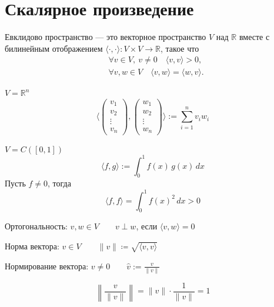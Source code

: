 \section{Скалярное произведение}

\begin{definition}
    Евклидово пространство --- это векторное пространство $V$ над $\mathbb{R}$
    вместе с билинейным отображением $\langle\cdot,\cdot\rangle \colon V \times V  \to \mathbb{R}$,
    такое что 
    \[
    \begin{aligned}
        &\forall v \in V, \ v \ne 0 \quad \langle v,v\rangle > 0, \\
        &\forall v, w \in V \quad \langle v, w\rangle = \langle w, v\rangle.
    \end{aligned}
    \]
\end{definition}

\begin{examplelist}
        \item $V = \mathbb{R}^n$
            \[
            \langle
            \begin{pmatrix} v_1 \\ v_2 \\ \vdots \\ v_n \end{pmatrix},
            \begin{pmatrix} w_1 \\ w_2 \\ \vdots \\ w_n \end{pmatrix}
            \rangle
            := \sum_{i=1}^{n} v_i w_i
            \]
        \item $V = C([0,1])$
            \[
            \langle f, g\rangle := \int_0^1 f(x)\, g(x)\, dx
            \]
            Пусть $f \neq 0$, тогда
            \[
            \langle f, f\rangle = \int_0^1 f(x)^2\, dx > 0
            \]
\end{examplelist}


\begin{definition}
    Ортогональность:
    $v, w \in V \qquad v \perp w$, если $\langle v,w\rangle = 0$
\end{definition}

\begin{definition}
    Норма вектора:
    $v \in V \qquad \lVert v \rVert \coloneqq \sqrt{\langle v, v \rangle}$
\end{definition}

\begin{definition}
    Нормирование вектора:
    $v \neq 0 \qquad \hat{v} := \frac{v}{\|v\|}$

    \[
        \left\lVert \frac{v}{\|v\|} \right\rVert
        = \|v\| \cdot
        \frac{1}{\|v\|} = 1
    \]
\end{definition}


